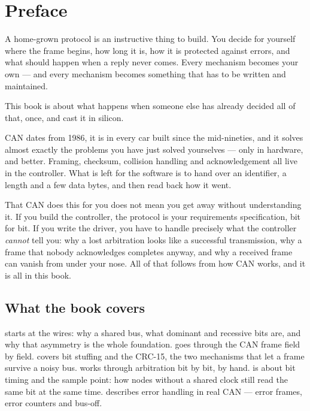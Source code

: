 \chapter*{Preface}

A home-grown protocol is an instructive thing to build. You decide for yourself where the frame
begins, how long it is, how it is protected against errors, and what should happen when a reply
never comes. Every mechanism becomes your own --- and every mechanism becomes something that has
to be written and maintained.

This book is about what happens when someone else has already decided all of that, once, and cast
it in silicon.

CAN dates from 1986, it is in every car built since the mid-nineties, and it solves almost exactly
the problems you have just solved yourselves --- only in hardware, and better. Framing, checksum,
collision handling and acknowledgement all live in the controller. What is left for the software
is to hand over an identifier, a length and a few data bytes, and then read back how it went.

\begin{aside}
\note That CAN does this for you does not mean you get away without understanding it. If you build
the controller, the protocol is your requirements specification, bit for bit. If you write the
driver, you have to handle precisely what the controller \emph{cannot} tell you: why a lost
arbitration looks like a successful transmission, why a frame that nobody acknowledges completes
anyway, and why a received frame can vanish from under your nose. All of that follows from how CAN
works, and it is all in this book.
\end{aside}

\section*{What the book covers}

 starts at the wires: why a shared bus, what dominant and recessive bits are, and
why that asymmetry is the whole foundation.  goes through the CAN frame
field by field.  covers bit stuffing and the CRC-15, the two mechanisms that
let a frame survive a noisy bus.  works through arbitration bit by bit, by
hand.  is about bit timing and the sample point: how nodes without a shared
clock still read the same bit at the same time.  describes error handling in real
CAN --- error frames, error counters and bus-off.

